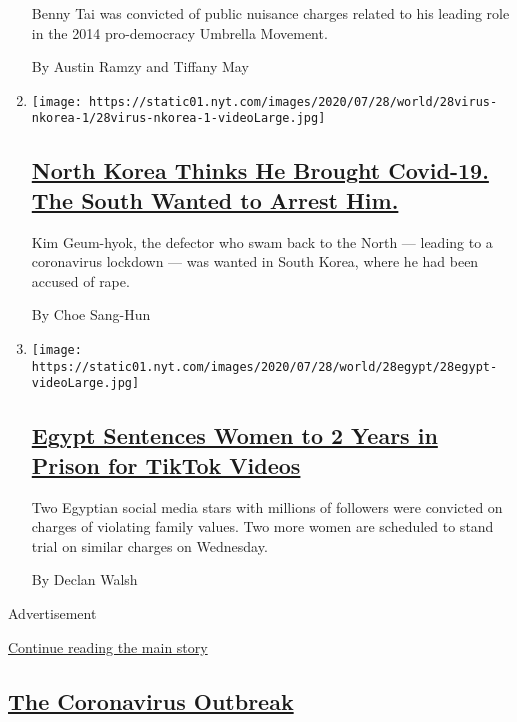 \begin{enumerate}
  Benny Tai was convicted of public nuisance charges related to his
  leading role in the 2014 pro-democracy Umbrella Movement.

  By Austin Ramzy and Tiffany May
\item
  \texttt{[image: https://static01.nyt.com/images/2020/07/28/world/28virus-nkorea-1/28virus-nkorea-1-videoLarge.jpg]}

  \hypertarget{north-korea-thinks-he-brought-covid-19-the-south-wanted-to-arrest-him}{%
  \subsection{\texorpdfstring{\href{/2020/07/28/world/asia/north-korea-defector-coronavirus.html}{North
  Korea Thinks He Brought Covid-19. The South Wanted to Arrest
  Him.}}{North Korea Thinks He Brought Covid-19. The South Wanted to Arrest Him.}}\label{north-korea-thinks-he-brought-covid-19-the-south-wanted-to-arrest-him}}

  Kim Geum-hyok, the defector who swam back to the North --- leading to
  a coronavirus lockdown --- was wanted in South Korea, where he had
  been accused of rape.

  By Choe Sang-Hun
\item
  \texttt{[image: https://static01.nyt.com/images/2020/07/28/world/28egypt/28egypt-videoLarge.jpg]}

  \hypertarget{egypt-sentences-women-to-2-years-in-prison-for-tiktok-videos}{%
  \subsection{\texorpdfstring{\href{/2020/07/28/world/middleeast/egypt-women-tiktok-prison.html}{Egypt
  Sentences Women to 2 Years in Prison for TikTok
  Videos}}{Egypt Sentences Women to 2 Years in Prison for TikTok Videos}}\label{egypt-sentences-women-to-2-years-in-prison-for-tiktok-videos}}

  Two Egyptian social media stars with millions of followers were
  convicted on charges of violating family values. Two more women are
  scheduled to stand trial on similar charges on Wednesday.

  By Declan Walsh
\end{enumerate}

Advertisement

\protect\hyperlink{after-mid1}{Continue reading the main story}

\hypertarget{the-coronavirus-outbreak}{%
\subsection{\texorpdfstring{\href{/news-event/coronavirus}{The
Coronavirus
Outbreak}}{The Coronavirus Outbreak}}\label{the-coronavirus-outbreak}}

